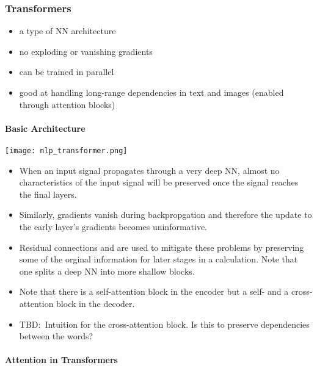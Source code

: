 \subsubsection{Transformers}
\newpar{}
\begin{itemize}
    \item a type of NN architecture
    \item no exploding or vanishing gradients
    \item can be trained in parallel
    \item good at handling long-range dependencies in text and images (enabled through attention blocks)
\end{itemize}
\paragraph{Basic Architecture}
\begin{center}
    \texttt{[image: nlp\_transformer.png]}
\end{center}

\newpar{}
\begin{itemize}
    \item When an input signal propagates through a very deep NN, almost no characteristics of the input signal will be preserved once the signal reaches the final layers.
    \item Similarly, gradients vanish during backpropgation and therefore the update to the early layer's gradients becomes uninformative.
    \item Residual connections and are used to mitigate these problems by preserving some of the orginal information for later stages in a calculation. Note that one splits a deep NN into more shallow blocks.
\end{itemize}

\newpar{}
\begin{itemize}
    \item Note that there is a self-attention block in the encoder but a self- and a cross-attention block in the decoder.
    \item TBD:\ Intuition for the cross-attention block. Is this to preserve dependencies between the words?
\end{itemize}

\paragraph{Attention in Transformers}
\newpar{}

